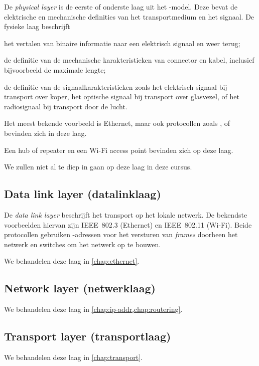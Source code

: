 De \emph{physical layer} is de eerste of onderste laag uit het -model.
Deze bevat de elektrische en mechanische definities van het transportmedium en het signaal.
De fysieke laag beschrijft
\begin{inlinelist}
\item het vertalen van binaire informatie naar een elektrisch signaal en weer terug;
\item de definitie van de mechanische karakteristieken van connector en kabel, inclusief bijvoorbeeld de maximale lengte;
\item de definitie van de signaalkarakteristieken zoals het elektrisch signaal bij transport over koper, het optische signaal bij transport over glasvezel, of het radiosignaal bij transport door de lucht.
\end{inlinelist}
Het meest bekende voorbeeld is Ethernet, maar ook protocollen zoals ,  of  bevinden zich in deze laag.

Een hub of repeater en een Wi-Fi access point bevinden zich op deze laag.

We zullen niet al te diep in gaan op deze laag in deze cursus.



\subsection{Data link layer (datalinklaag)}

De \emph{data link layer} beschrijft het transport op het lokale netwerk.
De bekendste voorbeelden hiervan zijn IEEE~802.3 (Ethernet) en IEEE~802.11 (Wi-Fi).
Beide protocollen gebruiken -adressen voor het versturen van \emph{frames} doorheen het netwerk en switches om het netwerk op te bouwen.

We behandelen deze laag in \cref{chap:ethernet}.


\subsection{Network layer (netwerklaag)}

We behandelen deze laag in \cref{chap:ip-addr,chap:routering}.

\subsection{Transport layer (transportlaag)}

We behandelen deze laag in \cref{chap:transport}.

